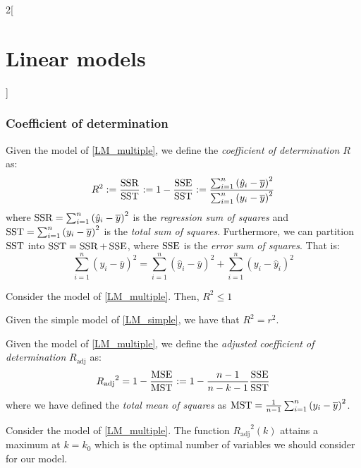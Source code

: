 \documentclass[../../../main_math.tex]{subfiles}
\begin{document}
\begin{multicols}{2}[\section{Linear models}]
  \subsubsection{Coefficient of determination}
  \begin{definition}
    Given the model of \cref{LM_multiple}, we define the \emph{coefficient of determination} $R$ as:
    $$R^2:=\frac{\operatorname{SSR}}{\operatorname{SST}}:=1-\frac{\operatorname{SSE}}{\operatorname{SST}}:=\frac{\sum_{i=1}^n{(\hat{y}_i-\overline{y})}^2}{\sum_{i=1}^n{(y_i-\overline{y})}^2}$$ where $\operatorname{SSR}=\sum_{i=1}^n{(\hat{y}_i-\overline{y})}^2$ is the \emph{regression sum of squares} and $\operatorname{SST}=\sum_{i=1}^n{(y_i-\overline{y})}^2$ is the \emph{total sum of squares}. Furthermore, we can partition $\operatorname{SST}$ into $\operatorname{SST}=\operatorname{SSR}+\operatorname{SSE}$, where $\operatorname{SSE}$ is the \emph{error sum of squares}. That is: $$\sum_{i=1}^n{(y_i-\overline{y})}^2=\sum_{i=1}^n{(\hat{y}_i-\overline{y})}^2+\sum_{i=1}^n{(y_i-\hat{y}_i)}^2$$
  \end{definition}
  \begin{lemma}
    Consider the model of \cref{LM_multiple}. Then, $R^2\leq 1$
  \end{lemma}
  \begin{proposition}
    Given the simple model of \cref{LM_simple}, we have that $R^2=r^2$.
  \end{proposition}
  \begin{definition}
    Given the model of \cref{LM_multiple}, we define the \emph{adjusted coefficient of determination} $R_{\mathrm{adj}}$ as: $${R_{\mathrm{adj}}}^2=1-\frac{\operatorname{MSE}}{\operatorname{MST}}:=1-\frac{n-1}{n-k-1}\frac{\operatorname{SSE}}{\operatorname{SST}}$$ where we have defined the \emph{total mean of squares} as $\operatorname{MST}=\frac{1}{n-1}\sum_{i=1}^n{(y_i-\overline{y})}^2$.
  \end{definition}
  \begin{lemma}
    Consider the model of \cref{LM_multiple}. The function ${R_{\mathrm{adj}}}^2(k)$ attains a maximum at $k=k_0$ which is the optimal number of variables we should consider for our model.
  \end{lemma}

\end{multicols}
\end{document}
